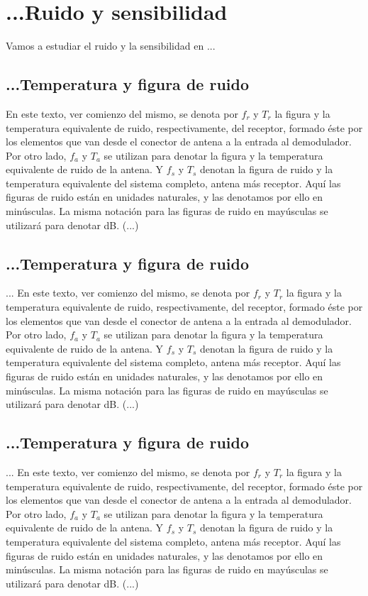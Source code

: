 
\section{...Ruido y sensibilidad}
Vamos a estudiar el ruido y la sensibilidad en ...

\subsection{...Temperatura y figura de ruido} 
En este texto, ver comienzo del mismo, se denota por $f_r$ y $T_r$ la figura y la temperatura equivalente de ruido, respectivamente, del receptor, formado éste por los elementos que van desde el conector de antena a la entrada al demodulador. Por otro lado, $f_a$ y $T_a$ se utilizan para denotar la figura y la temperatura equivalente de ruido de la antena. Y $f_s$ y $T_s$ denotan la figura de ruido y la temperatura equivalente del sistema completo, antena más receptor.  Aquí las figuras de ruido están en unidades naturales, y las denotamos por ello en minúsculas. La misma notación para las figuras de ruido en mayúsculas se utilizará para denotar dB. (...)%

\subsection{...Temperatura y figura de ruido} 
... En este texto, ver comienzo del mismo, se denota por $f_r$ y $T_r$ la figura y la temperatura equivalente de ruido, respectivamente, del receptor, formado éste por los elementos que van desde el conector de antena a la entrada al demodulador. Por otro lado, $f_a$ y $T_a$ se utilizan para denotar la figura y la temperatura equivalente de ruido de la antena. Y $f_s$ y $T_s$ denotan la figura de ruido y la temperatura equivalente del sistema completo, antena más receptor.  Aquí las figuras de ruido están en unidades naturales, y las denotamos por ello en minúsculas. La misma notación para las figuras de ruido en mayúsculas se utilizará para denotar dB. (...)%

\subsection{...Temperatura y figura de ruido} 
... En este texto, ver comienzo del mismo, se denota por $f_r$ y $T_r$ la figura y la temperatura equivalente de ruido, respectivamente, del receptor, formado éste por los elementos que van desde el conector de antena a la entrada al demodulador. Por otro lado, $f_a$ y $T_a$ se utilizan para denotar la figura y la temperatura equivalente de ruido de la antena. Y $f_s$ y $T_s$ denotan la figura de ruido y la temperatura equivalente del sistema completo, antena más receptor.  Aquí las figuras de ruido están en unidades naturales, y las denotamos por ello en minúsculas. La misma notación para las figuras de ruido en mayúsculas se utilizará para denotar dB. (...)%

\endinput
